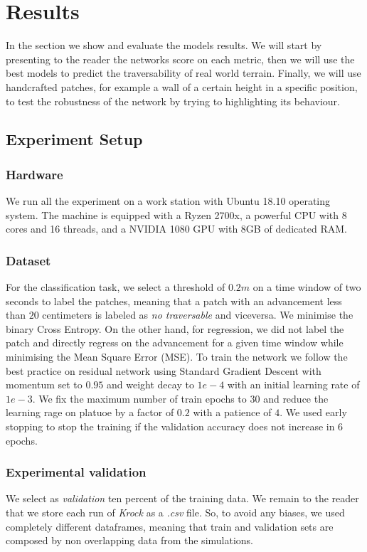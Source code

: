 \documentclass[../document.tex]{subfiles}
\begin{document}
\section{Results}
In the section we show and evaluate the models results. We will start by presenting to the reader the networks score on each metric, then we will use the best models to predict the traversability of real world terrain. Finally, we will use handcrafted patches, for example a wall of a certain height in a specific position, to test the robustness of the network by trying to highlighting its behaviour.
\subsection{Experiment Setup}
\subsubsection{Hardware}
We run all the experiment on a work station with Ubuntu 18.10 operating system. The machine is equipped with a Ryzen 2700x, a powerful CPU with 8 cores and 16 threads, and a NVIDIA 1080 GPU with 8GB of dedicated RAM.
\subsubsection{Dataset}
For the classification task, we select a threshold of $0.2m$ on a time window of two seconds to label the patches, meaning that a patch with an advancement less than $20$ centimeters is labeled as \emph{no traversable} and viceversa. We minimise the binary Cross Entropy. 
On the other hand, for regression, we did not label the patch and directly regress on the advancement for a given time window while minimising the Mean Square Error (MSE). 
To train the network we follow the best practice on residual network \cite{he2015deep} using Standard Gradient Descent with momentum set to $0.95$ and weight decay to $1e-4$ with an initial learning rate of $1e-3$.
We fix the maximum number of train epochs to $30$ and reduce the learning rage on platuoe  by a factor of $0.2$ with a patience of $4$. We used early stopping to stop the training if the validation accuracy does not increase in $6$ epochs.

\subsubsection{Experimental validation}
We select as \emph{validation} ten percent of the training data. We remain to the reader that we store each run of \emph{Krock} as a \emph{.csv} file. So, to avoid any biases, we used completely different dataframes, meaning that train and validation sets are composed by non overlapping data from the simulations.
\end{document}
